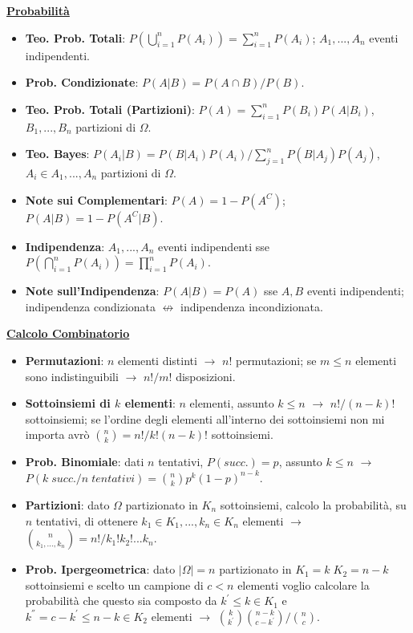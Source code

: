 \documentclass{article}
\begin{document}
\thispagestyle{empty}
\begin{multicols*}{3}

\textbf{\underline{Probabilità}}
\begin{itemize}
    \item \textbf{Teo. Prob. Totali}: $P(\bigcup_{i=1}^{n}P(A_{i}))=\sum_{i=1}^{n}P(A_{i})$; $A_{1},...,A_{n}$ eventi indipendenti.
    \item \textbf{Prob. Condizionate}: $P(A|B)={P(A\cap B)}/{P(B)}$.
    \item \textbf{Teo. Prob. Totali (Partizioni)}: $P(A)=\sum_{i=1}^{n}P(B_{i})P(A|B_{i})$, $B_{1},...,B_{n}$ partizioni di $\Omega$.
    \item \textbf{Teo. Bayes}: $P(A_{i}|B)=P(B|A_{i})P(A_{i})/\sum_{j=1}^{n}P(B|A_{j})P(A_j)$, $A_{i}\in A_{1},...,A_{n}$ partizioni di $\Omega$.
    \item \textbf{Note sui Complementari}: $P(A)=1-P(A^{C})$; $P(A|B)=1-P(A^{C}|B)$.
    \item \textbf{Indipendenza}: $A_{1},...,A_{n}$ eventi indipendenti sse $P(\bigcap_{i=1}^{n}P(A_{i}))=\prod_{i=1}^{n}P(A_{i})$.
    \item \textbf{Note sull'Indipendenza}: $P(A|B)=P(A)$ sse $A, B$ eventi indipendenti; indipendenza condizionata $\nleftrightarrow$ indipendenza incondizionata.
\end{itemize}

\textbf{\underline{Calcolo Combinatorio}}
\begin{itemize}
    \item \textbf{Permutazioni}: $n$ elementi distinti $\rightarrow$ $n!$ permutazioni; se $m\leq n$ elementi sono indistinguibili $\rightarrow$ ${n!}/{m!}$ disposizioni.
    \item \textbf{Sottoinsiemi di $k$ elementi}: $n$ elementi, assunto $k\leq n$ $\rightarrow$ ${n!}/{(n-k)!}$ sottoinsiemi; se l'ordine degli elementi all'interno dei sottoinsiemi non mi importa avrò $\binom{n}{k}={n!}/{k!(n-k)!}$ sottoinsiemi.
    \item \textbf{Prob. Binomiale}: dati $n$ tentativi, $P(succ.)=p$, assunto $k\leq n$ $\rightarrow$ $P({k\; succ.}/{n\; tentativi})=\binom{n}{k}p^{k}(1-p)^{n-k}$.
    \item \textbf{Partizioni}: dato $\Omega$ partizionato in $K_{n}$ sottoinsiemi, calcolo la probabilità, su $n$ tentativi, di ottenere $k_{1}\in K_{1},...,k_{n}\in K_{n}$ elementi $\rightarrow$ $\binom{n}{k_{1},...,k_{n}}={n!}/{k_{1}!k_{2}!...k_{n}}$.
    \item \textbf{Prob. Ipergeometrica}: dato $|\Omega|=n$ partizionato in $K_{1}=k\; K_{2}=n-k$ sottoinsiemi e scelto un campione di $c<n$ elementi voglio calcolare la probabilità che questo sia composto da $k^{'}\leq k\in K_{1}$ e $k^{''} = c-k^{'}\leq n-k\in K_{2}$ elementi $\rightarrow$ ${\binom{k}{k^{'}}\binom{n-k}{c-k^{'}}}/{\binom{n}{c}}$.
\end{itemize}


\end{multicols*}
\end{document}
